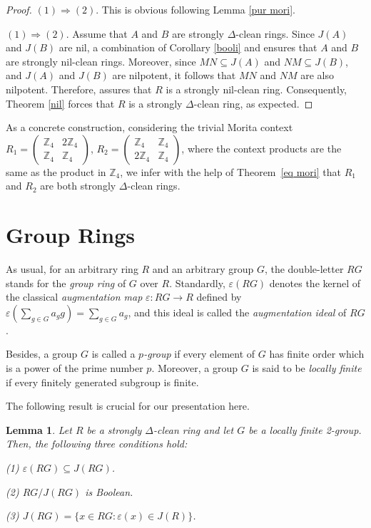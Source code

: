 \documentclass[12pt]{amsart}
\newtheorem{lemma}[theorem]{Lemma}
\theoremstyle{definition}
\begin{document}
\begin{proof}
$(1) \Rightarrow (2)$. This is obvious following Lemma \ref{pur mori}.

$(1) \Rightarrow (2)$. Assume that $A$ and $B$ are strongly $\Delta$-clean rings. Since $J(A)$ and $J(B)$ are nil, a combination of Corollary \ref{booli} and \cite[Theorem 2.7]{kwz} ensures that $A$ and $B$ are strongly nil-clean rings. Moreover, since $MN \subseteq J(A)$ and $NM \subseteq J(B)$, and $J(A)$ and $J(B)$ are nilpotent, it follows that $MN$ and $NM$ are also nilpotent. Therefore, \cite[Theorem 3.4]{kwz} assures that $R$ is a strongly nil-clean ring. Consequently, Theorem \ref{nil} forces that $R$ is a strongly $\Delta$-clean ring, as expected.
\end{proof}

As a concrete construction, considering the trivial Morita context $R_1 =
\begin{pmatrix}
\mathbb{Z}_4 & 2\mathbb{Z}_4 \\
\mathbb{Z}_4 & \mathbb{Z}_4
\end{pmatrix}$,
$R_2 =
\begin{pmatrix}
\mathbb{Z}_4 & \mathbb{Z}_4 \\
2 \mathbb{Z}_4 & \mathbb{Z}_4
\end{pmatrix}$,
where the context products are the same as the product in $\mathbb{Z}_4$, we infer with the help of
Theorem~\ref{eq mori} that $R_1$ and $R_2$ are both strongly $\Delta$-clean rings.

\section{Group Rings}

As usual, for an arbitrary ring $R$ and an arbitrary group $G$, the double-letter $RG$ stands for the {\it group ring} of $G$ over $R$. Standardly, $\varepsilon(RG)$ denotes the kernel of the classical {\it augmentation map} $\varepsilon: RG\to R$ defined by $\varepsilon (\displaystyle\sum_{g\in G}a_{g}g)=\displaystyle\sum_{g\in G}a_{g}$, and this ideal is called the {\it augmentation ideal} of $RG$.

Besides, a group $G$ is called a {\it $p$-group} if every element of $G$ has finite order which is a power of the prime number $p$. Moreover, a group $G$ is said to be {\it locally finite} if every finitely generated subgroup is finite.

The following result is crucial for our presentation here.

\begin{lemma}\label{prop group ring}
Let $R$ be a strongly $\Delta$-clean ring and let $G$ be a locally finite 2-group. Then, the following three conditions hold:

(1) $\varepsilon(RG) \subseteq J(RG)$.

(2) $RG/J(RG)$ is Boolean.

(3) $J(RG) = \{x \in RG : \varepsilon(x) \in J(R)\}$.
\end{lemma}
\end{document}
